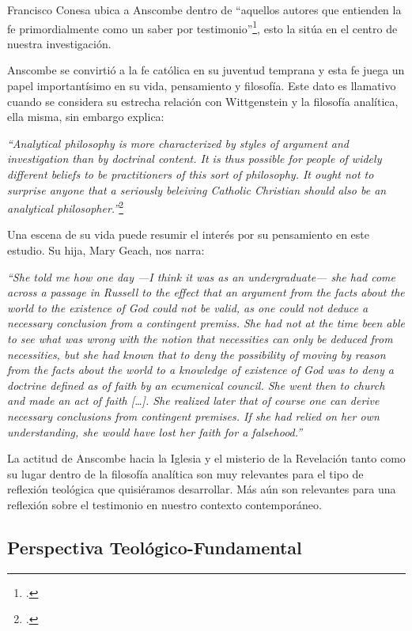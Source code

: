 \documentclass[11pt]{article}
\begin{document}
Francisco Conesa ubica a Anscombe dentro de ``aquellos autores que entienden la fe primordialmente como un saber por testimonio''\footcite[84]{cyc}, esto la sitúa en el centro de nuestra investigación. 

Anscombe se convirtió a la fe católica en su juventud temprana y esta fe juega un papel importantísimo en su vida, pensamiento y filosofía. Este dato es llamativo cuando se considera su estrecha relación con Wittgenstein y la filosofía analítica, ella misma, sin embargo explica:

\emph{
``Analytical philosophy is more characterized by styles of argument and investigation than by doctrinal content. It is thus possible for people of widely different beliefs to be practitioners of this sort of philosophy. It ought not to surprise anyone that a seriously beleiving Catholic Christian should also be an analytical philosopher.''}\footcite[66]{opinionsanscombe}

Una escena de su vida puede resumir el interés por su pensamiento en este estudio. Su hija, Mary Geach, nos narra:

\emph{
``She told me how one day ---I think it was as an undergraduate--- she had come across a passage in Russell to the effect that an argument from the facts about the world to the existence of God could not be valid, as one could not deduce a necessary conclusion from a contingent premiss. She had not at the time been able to see what was wrong with the notion that necessities can only be deduced from necessities, but she had known that to deny the possibility of moving by reason from the facts about the world to a knowledge of existence of God was to deny a doctrine defined as of faith by an ecumenical council. She went then to church and made an act of faith [\ldots]. She realized later that of course one can derive necessary conclusions from contingent premises. If she had relied on her own understanding, she would have lost her faith for a falsehood.''}

La actitud de Anscombe hacia la Iglesia y el misterio de la Revelación tanto como su lugar dentro de la filosofía analítica son muy relevantes para el tipo de reflexión teológica que quisiéramos desarrollar. Más aún son relevantes para una reflexión sobre el testimonio en nuestro contexto contemporáneo.

\subsection{Perspectiva Teológico-Fundamental}
\end{document}
